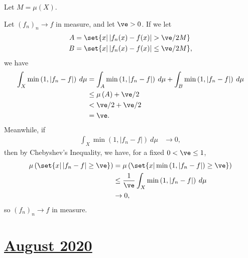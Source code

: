 \documentclass[10pt]{mypackage}
\begin{document}
Let $M = \mu(X)$.\newline

Let $\left( f_n \right)_n\rightarrow f$ in measure, and let $\ve > 0$. If we let
\begin{align*}
  A &= \set{x | \left\vert f_n(x)-f(x) \right\vert > \ve/2M}\\
  B &= \set{x | \left\vert f_n(x)-f(x) \right\vert \leq \ve/2M},
\end{align*}
we have
\begin{align*}
  \int_{X}^{} \min\left( 1,\left\vert f_n-f \right\vert \right)\:d\mu &= \int_{A}^{} \min\left( 1,\left\vert f_n-f \right\vert \right) \:d\mu + \int_{B}^{} \min\left( 1,\left\vert f_n-f \right\vert \right) \:d\mu\\
                                                                      &\leq \mu\left( A \right) + \ve/2\\
                                                                      &< \ve/2 + \ve/2\\
                                                                      &= \ve.
\end{align*}
Meanwhile, if
\begin{align*}
  \int_{X}^{} \min\left( 1,\left\vert f_n-f \right\vert \right)\:d\mu &\rightarrow 0,
\end{align*}
then by Chebyshev's Inequality, we have, for a fixed $0 < \ve \leq 1$,
\begin{align*}
  \mu\left( \set{x | \left\vert f_n-f \right\vert \geq \ve} \right) &= \mu \left( \set{x | \min\left( 1,\left\vert f_n-f \right\vert \right) \geq \ve} \right)\\
                                                                    &\leq \frac{1}{\ve} \int_{X}^{} \min\left( 1,\left\vert f_n-f \right\vert \right)\:d\mu\\
                                                                    &\rightarrow 0,
\end{align*}
so $\left( f_n \right)_n\rightarrow f$ in measure.
\section{\href{https://math.virginia.edu/graduate/exams/analysis/2020Aug_real.pdf}{August 2020}}%
\end{document}
